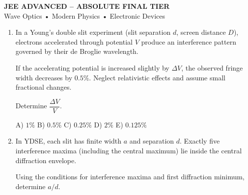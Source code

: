 \documentclass[12pt]{article}
\begin{document}
\begin{center}
\Large \textbf{JEE ADVANCED – ABSOLUTE FINAL TIER}\\
\large Wave Optics \quad • \quad Modern Physics \quad • \quad Electronic Devices
\end{center}

\vspace{0.5cm}

\begin{enumerate}

\item In a Young’s double slit experiment (slit separation $d$, screen distance $D$), 
electrons accelerated through potential $V$ produce an interference pattern governed by their de Broglie wavelength. 

If the accelerating potential is increased slightly by $\Delta V$, the observed fringe width decreases by $0.5\%$. 
Neglect relativistic effects and assume small fractional changes.

Determine $\dfrac{\Delta V}{V}$.
\begin{center}
\end{center}

A) $1\%$ \quad
B) $0.5\%$ \quad
C) $0.25\%$ \quad
D) $2\%$ \quad
E) $0.125\%$

\item In YDSE, each slit has finite width $a$ and separation $d$. 
Exactly five interference maxima (including the central maximum) lie inside the central diffraction envelope. 

Using the conditions for interference maxima and first diffraction minimum, determine $a/d$.


\end{enumerate}
\end{document}
